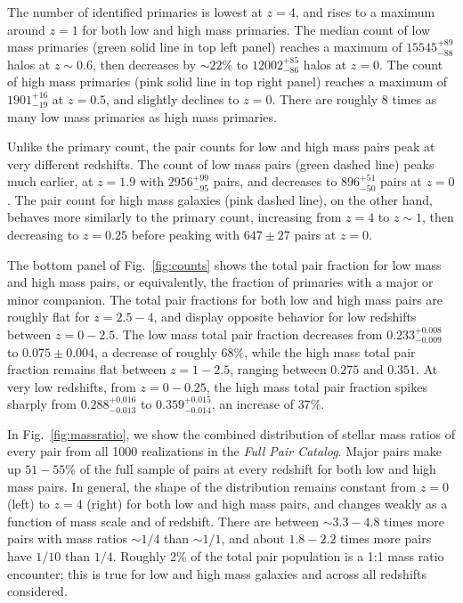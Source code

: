 \documentclass[twocolumn]{aastex631}
\newcommand{\paircat}{\textit{Full Pair Catalog}}
\begin{document}
    The number of identified primaries is lowest at $z=4$, and rises to a maximum around $z=1$ for both low and high mass primaries.
    The median count of low mass primaries (green solid line in top left panel) reaches a maximum of $15545^{+89}_{-88}$ halos at $z\sim0.6$, then decreases by $\sim22\%$ to $12002^{+85}_{-86}$ halos at $z=0$. 
    The count of high mass primaries (pink solid line in top right panel) reaches a maximum of $1901^{+16}_{-19}$ at $z=0.5$, and slightly declines to $z=0$. 
    There are roughly 8 times as many low mass primaries as high mass primaries. 

    Unlike the primary count, the pair counts for low and high mass pairs peak at very different redshifts. 
    The count of low mass pairs (green dashed line) peaks much earlier, at $z=1.9$ with $2956^{+99}_{-95}$ pairs, and decreases to $896^{+51}_{-50}$ pairs at $z=0$.
    The pair count for high mass galaxies (pink dashed line), on the other hand, behaves more similarly to the primary count, increasing from $z=4$ to $z\sim1$, then decreasing to $z=0.25$ before peaking with $647\pm27$ pairs at $z=0$. 

    The bottom panel of Fig.~\ref{fig:counts} shows the total pair fraction for low mass and high mass pairs, or equivalently, the fraction of primaries with a major or minor companion.
    The total pair fractions for both low and high mass pairs are roughly flat for $z=2.5-4$, and display opposite behavior for low redshifts between $z=0-2.5$. 
    The low mass total pair fraction decreases from $0.233^{+0.008}_{-0.009}$ to $0.075\pm 0.004$, a decrease of roughly $68\%$, while the high mass total pair fraction remains flat between $z=1-2.5$, ranging between $0.275$ and $0.351$.
    At very low redshifts, from $z=0-0.25$, the high mass total pair fraction spikes sharply from $0.288^{+0.016}_{-0.013}$ to $0.359^{+0.015}_{-0.014}$, an increase of $37\%$.

    In Fig.~\ref{fig:massratio}, we show the combined distribution of stellar mass ratios of every pair from all 1000 realizations in the \paircat.
    Major pairs make up $51-55\%$ of the full sample of pairs at every redshift for both low and high mass pairs.
    In general, the shape of the distribution remains constant from $z=0$ (left) to $z=4$ (right) for both low and high mass pairs, and changes weakly as a function of mass scale and of redshift. 
    There are between $\sim3.3-4.8$ times more pairs with mass ratios $\sim1/4$ than $\sim1/1$, and about $1.8-2.2$ times more pairs have $1/10$ than $1/4$. 
    Roughly 2\% of the total pair population is a 1:1 mass ratio encounter; this is true for low and high mass galaxies and across all redshifts considered.  
\end{document}
